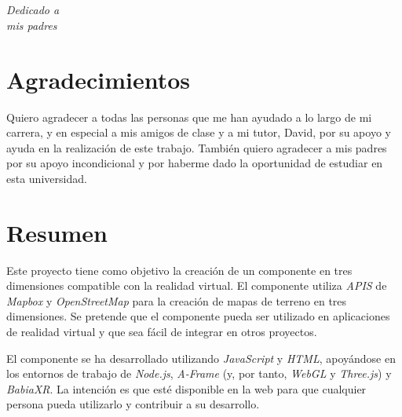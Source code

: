 \documentclass[a4paper, 12pt]{book}
\begin{document}

\chapter*{}
\begin{flushright}
\textit{Dedicado a \\
mis padres}
\end{flushright}


\chapter*{Agradecimientos}

Quiero agradecer a todas las personas que me han ayudado a lo largo de mi carrera, y en especial a mis amigos de clase
y a mi tutor, David, por su apoyo y ayuda en la realización de este trabajo. También quiero agradecer a mis padres por su apoyo incondicional 
y por haberme dado la oportunidad de estudiar en esta universidad.


\chapter*{Resumen}

Este proyecto tiene como objetivo la creación de un componente en tres dimensiones compatible
con la realidad virtual. El componente utiliza \textit{APIS} de \textit{Mapbox} y \textit{OpenStreetMap} 
para la creación de mapas de terreno en tres dimensiones. Se pretende que el componente
pueda ser utilizado en aplicaciones de realidad virtual y que sea fácil de integrar
en otros proyectos.

El componente se ha desarrollado utilizando \textit{JavaScript} y \textit{HTML}, apoyándose en
los entornos de trabajo de \textit{Node.js}, \textit{A-Frame} (y, por tanto, \textit{WebGL} y \textit{Three.js}) y \textit{BabiaXR}.
La intención es que esté disponible en la web para que cualquier persona pueda
utilizarlo y contribuir a su desarrollo.
\end{document}

